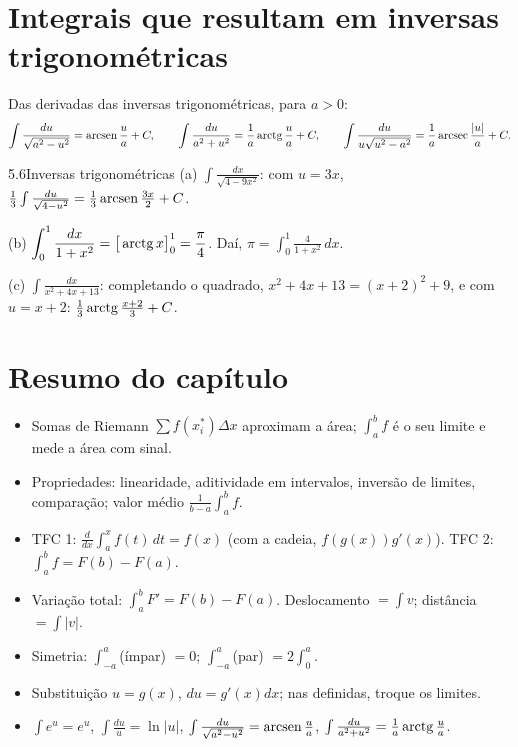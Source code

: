 \section{Integrais que resultam em inversas trigonométricas}

Das derivadas das inversas trigonométricas, para $a>0$:
\[
\int\frac{du}{\sqrt{a^2-u^2}}=\operatorname{arcsen}\frac ua+C,\qquad
\int\frac{du}{a^2+u^2}=\frac1a\operatorname{arctg}\frac ua+C,\qquad
\int\frac{du}{u\sqrt{u^2-a^2}}=\frac1a\operatorname{arcsec}\frac{|u|}a+C .
\]

\begin{exemplo}{5.6}{Inversas trigonométricas}
(a) $\displaystyle\int\frac{dx}{\sqrt{4-9x^2}}$: com $u=3x$, $\frac13\int\frac{du}{\sqrt{4-u^2}}
=\frac13\operatorname{arcsen}\frac{3x}2+C$.

(b) $\displaystyle\int_0^1\frac{dx}{1+x^2}=\big[\operatorname{arctg} x\big]_0^1=\frac\pi4$. Daí,
$\pi=\int_0^1\frac{4}{1+x^2}\,dx$.

(c) $\displaystyle\int\frac{dx}{x^2+4x+13}$: completando o quadrado, $x^2+4x+13=(x+2)^2+9$, e
com $u=x+2$: $\frac13\operatorname{arctg}\frac{x+2}3+C$.
\end{exemplo}

\section*{Resumo do capítulo}
\begin{itemize}
\item Somas de Riemann $\sum f(x_i^*)\Delta x$ aproximam a área; $\int_a^bf$ é o seu limite e
  mede a área com sinal.
\item Propriedades: linearidade, aditividade em intervalos, inversão de limites, comparação;
  valor médio $\frac1{b-a}\int_a^bf$.
\item TFC 1: $\frac d{dx}\int_a^xf(t)\,dt=f(x)$ (com a cadeia, $f(g(x))g'(x)$).
  TFC 2: $\int_a^bf=F(b)-F(a)$.
\item Variação total: $\int_a^bF'=F(b)-F(a)$. Deslocamento $=\int v$; distância
  $=\int|v|$.
\item Simetria: $\int_{-a}^a$(ímpar) $=0$; $\int_{-a}^a$(par) $=2\int_0^a$.
\item Substituição $u=g(x)$, $du=g'(x)dx$; nas definidas, troque os limites.
\item $\int e^u=e^u$, $\int\frac{du}u=\ln|u|$, $\int\frac{du}{\sqrt{a^2-u^2}}=\operatorname{arcsen}\frac ua$,
  $\int\frac{du}{a^2+u^2}=\frac1a\operatorname{arctg}\frac ua$.
\end{itemize}


